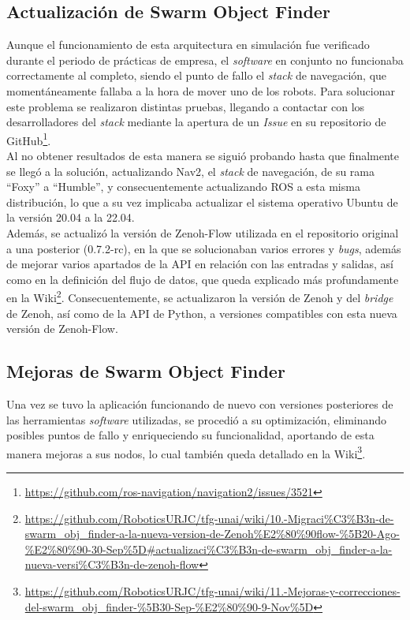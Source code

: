 \subsection{Actualización de Swarm Object Finder}
\label{sec:actualizacion_swarm_obj_finder}

Aunque el funcionamiento de esta arquitectura en simulación fue verificado
durante el periodo de prácticas de empresa, el \textit{software} en conjunto no
funcionaba correctamente al completo, siendo el punto de fallo el \textit{stack}
de navegación, que momentáneamente fallaba a la hora de mover uno de los robots.
Para solucionar este problema se realizaron distintas pruebas, llegando a
contactar con los desarrolladores del \textit{stack} mediante la apertura de un
\textit{Issue} en su repositorio de GitHub\footnote{
\url{https://github.com/ros-navigation/navigation2/issues/3521}}.
\\

Al no obtener resultados de esta manera se siguió probando hasta que finalmente
se llegó a la solución, actualizando Nav2, el \textit{stack} de navegación, de
su rama ``Foxy'' a ``Humble'', y consecuentemente actualizando ROS a esta misma
distribución, lo que a su vez implicaba actualizar el sistema operativo Ubuntu
de la versión 20.04 a la 22.04.
\\

Además, se actualizó la versión de Zenoh-Flow utilizada en el repositorio
original a una posterior (0.7.2-rc), en la que se solucionaban varios errores y
\textit{bugs}, además de mejorar varios apartados de la API en relación con las
entradas y salidas, así como en la definición del flujo de datos, que queda
explicado más profundamente en la Wiki\footnote{
\url{https://github.com/RoboticsURJC/tfg-unai/wiki/10.-Migraci\%C3\%B3n-de-swarm\_obj\_finder-a-la-nueva-version-de-Zenoh\%E2\%80\%90flow-\%5B20-Ago-\%E2\%80\%90-30-Sep\%5D\#actualizaci\%C3\%B3n-de-swarm\_obj\_finder-a-la-nueva-versi\%C3\%B3n-de-zenoh-flow}}.
Consecuentemente, se actualizaron la versión de Zenoh y del \textit{bridge} de
Zenoh, así como de la API de Python, a versiones compatibles con esta nueva
versión de Zenoh-Flow.
\\

\subsection{Mejoras de Swarm Object Finder}
\label{sec:mejoras_swarm_obj_finder}

Una vez se tuvo la aplicación funcionando de nuevo con versiones posteriores de
las herramientas \textit{software} utilizadas, se procedió a su optimización,
eliminando posibles puntos de fallo y enriqueciendo su funcionalidad, aportando
de esta manera mejoras a sus nodos, lo cual también queda detallado en la
Wiki\footnote{
\url{https://github.com/RoboticsURJC/tfg-unai/wiki/11.-Mejoras-y-correcciones-del-swarm\_obj\_finder-\%5B30-Sep-\%E2\%80\%90-9-Nov\%5D}}.
\\

